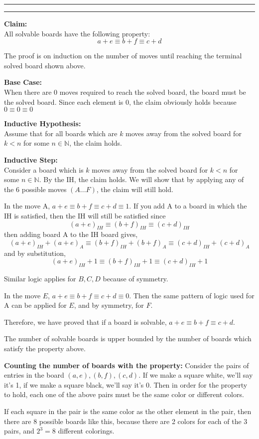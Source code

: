 \documentclass[11pt]{article}
\newcounter{questionCounter}
\newcounter{partCounter}[questionCounter]
\newenvironment{question}[2][\arabic{questionCounter}]{%
    \setcounter{partCounter}{0}%
    \vspace{.25in} \hrule \vspace{0.5em}%
        \noindent{\bf #2}%
    \vspace{0.8em} \hrule \vspace{.10in}%
    \addtocounter{questionCounter}{1}%
}{}
\begin{document}
\begin{question}{Aren't Games Fun? (JD's Problem)}
\textbf{Claim:}\\
All solvable boards have the following property:
$$ a+e \equiv b+f \equiv c+d $$

The proof is on induction on the number of moves
until reaching the terminal solved board shown above.

\textbf{Base Case:}\\
When there are 0 moves required to reach the solved board, the
board must be the solved board. Since each element is 0,
the claim obviously holds because $0 \equiv 0 \equiv 0$

\textbf{Inductive Hypothesis:}\\
Assume that for all boards which are $k$ moves away from the solved board 
for $k<n$ for some $n\in\mathbb{N}$, the claim holds.

\textbf{Inductive Step:}\\
Consider a board which is $k$ moves away from the solved board 
for $k<n$ for some $n\in\mathbb{N}$. By the IH, the claim holds.
We will show that by applying any of the 6 possible moves $(A...F)$,
the claim will still hold.

In the move A, $ a+e \equiv b+f \equiv c+d \equiv 1$. If you add A to 
a board in which the IH is satisfied, then the IH will still be satisfied since
$$ (a+e)_{IH} \equiv (b+f)_{IH} \equiv (c+d)_{IH}$$
then adding board A to the IH board gives,
$$ (a+e)_{IH}+(a+e)_{A}\equiv (b+f)_{IH}+(b+f)_{A} \equiv (c+d)_{IH}+(c+d)_{A}$$
and by substitution,
$$ (a+e)_{IH}+1 \equiv (b+f)_{IH}+1 \equiv (c+d)_{IH}+1$$

Similar logic applies for $B,C,D$ because of symmetry.

In the move $E$, $ a+e \equiv b+f \equiv c+d \equiv 0$. Then the
same pattern of logic used for A can be applied for $E$, and 
by symmetry, for $F$.

Therefore, we have proved that if a board is solvable, 
$ a+e \equiv b+f \equiv c+d $.

The number of solvable boards is upper bounded by the number of boards which satisfy the property above.

\textbf{Counting the number of boards with the property:}
Consider the pairs of entries in the board $(a,e),(b,f),(c,d)$.
If we make a square white, we'll say it's 1, if we make a square black, we'll say it's 0.
Then in order for the property to hold, each one of the above pairs must be the same color
or different colors.

If each square in the pair is the same color as the other element in the pair,
then there are 8 possible boards like this, because there are 2 colors for each of the 
3 pairs, and $2^3=8$ different colorings.


\end{question}
\end{document}
